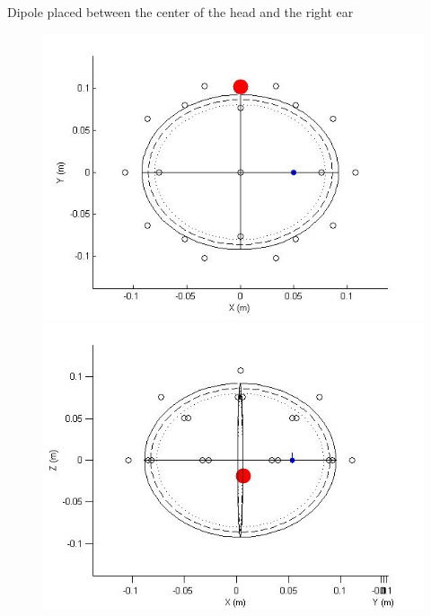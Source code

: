 \documentclass[t,12pt,english
\ifx\beamermode\undefined\else,\beamermode\fi
]{beamer}
\begin{document}
\begin{frame}{Dipole placed between the center of the head and the right ear}

\begin{figure}[!htbp]
%
\centering
\includegraphics[width=1\textwidth]{2.jpg}
\endminipage\hfill
{}%
\centering
\includegraphics[width=1\textwidth]{3.jpg}
\endminipage\hfill
\end{figure}

\end{frame}
\end{document}
